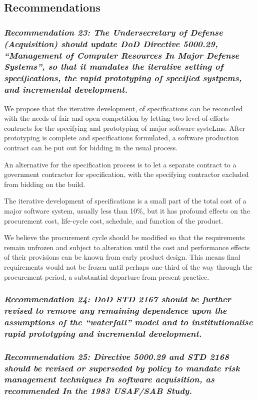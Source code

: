 \documentclass[12pt,final]{article}
\begin{document}
\subsection*{Recommendations}

\subsubsection*{\textit{Recommendation 23: The Undersecretary of Defense
(Acquisition) should update DoD Directive 5000.29, “Management of Computer
Resources In Major Defense Systems”, so that it mandates the iterative setting
of specifications, the rapid prototyping of specified systpems, and incremental
development.}}

We propose that the iterative development, of specifications can be reconciled
with the needs of fair and open competition by letting two level-of-efforts
contracts for the specifying and prototyping of major software systeLms. After
prototyping is complete and specifications formulated, a software production
contract can be put out for bidding in the usual process.

An alternative for the specification process is to let a separate contract to a government
contractor for specification, with the specifying contractor excluded from bidding on the
build.

The iterative development of specifications is a small part of the total cost
of a major software system, usually less than 10\%, but it has profound effects
on the procurement cost, life-cycle cost, schedule, and function of the
product.

We believe the procurement cycle should be modified so that the requirements
remain unfrozen and subject to alteration until the cost and performance
effects of their provisions can be known from early product design. This means
final requirements would not be frozen until perhaps one-third of the way
through the procurement period, a substantial departure from present practice.

\subsubsection*{\textit{Recommendation 24: DoD STD 2167 should be further revised to remove
any remaining dependence upon the assumptions of the “waterfall” model and
to institutionalise rapid prototyping and incremental development.}}

\subsubsection*{\textit{Recommendation 25: Directive 5000.29 and STD 2168 should be revised
or superseded by policy to mandate risk management techniques In software
acquisition, as recommended In the 1983 USAF/SAB Study.}}
\end{document}

